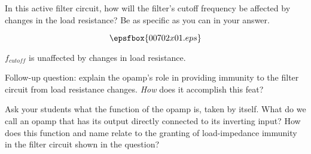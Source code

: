 

In this active filter circuit, how will the filter's cutoff frequency be affected by changes in the load resistance?  Be as specific as you can in your answer.

$$\epsfbox{00702x01.eps}$$







$f_{cutoff}$ is unaffected by changes in load resistance.

\vskip 10pt

Follow-up question: explain the opamp's role in providing immunity to the filter circuit from load resistance changes.  {\it How} does it accomplish this feat?







Ask your students what the function of the opamp is, taken by itself.  What do we call an opamp that has its output directly connected to its inverting input?  How does this function and name relate to the granting of load-impedance immunity in the filter circuit shown in the question?




